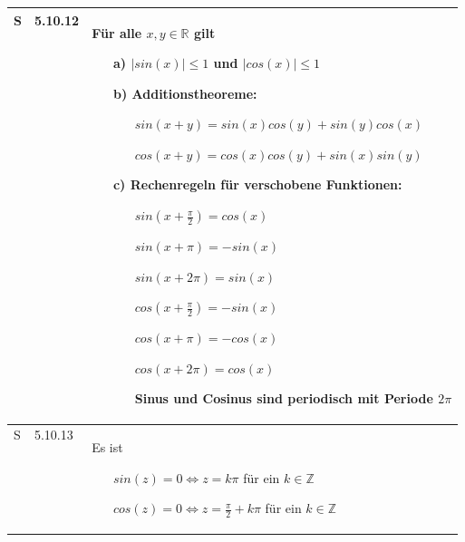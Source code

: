 \begin{longtable}{p{0.75cm} p{1cm} p{16cm}}
        \midrule
        S   & 5.10.12&  Für alle $x,y \in \mathbb{R}$ gilt 
                        \begin{itemize}[topsep=-0.5cm]
                            \item[a)] $|sin(x)| \leq 1$ und $|cos(x)| \leq 1$
                            \item[b)] Additionstheoreme:
                                        \begin{itemize}[topsep=-0.5cm]
                                            \item[] $sin(x+y) = sin(x)cos(y)+sin(y)cos(x)$
                                            \item[] $cos(x+y) = cos(x)cos(y)+sin(x)sin(y)$ 
                                        \end{itemize}
                            \item[c)] Rechenregeln für verschobene Funktionen:
                                        \begin{itemize}[topsep=-0.5cm]
                                            \item[] $sin(x + \frac{\pi}{2}) = cos(x)$
                                            \item[] $sin(x + \pi) = -sin(x)$
                                            \item[] $sin(x+2\pi) = sin(x)$
                                            \item[] $cos(x + \frac{\pi}{2}) = -sin(x)$
                                            \item[] $cos(x+\pi) = -cos(x)$
                                            \item[] $cos(x+2\pi) = cos(x)$
                                            \item[] Sinus und Cosinus sind periodisch mit Periode $2\pi$      
                                        \end{itemize} \vspace{-0cm}
                        \end{itemize} \\
        \midrule
        S   & 5.10.13&  Es ist
                        \begin{itemize}[topsep=-0.5cm]
                            \item[] $sin(z) = 0 \Leftrightarrow z = k\pi$ für ein $k \in \mathbb{Z}$
                            \item[] $cos(z) = 0 \Leftrightarrow z = \frac{\pi}{2}+k\pi$ für ein $k \in \mathbb{Z}$ 

\end{itemize}
\end{longtable}
